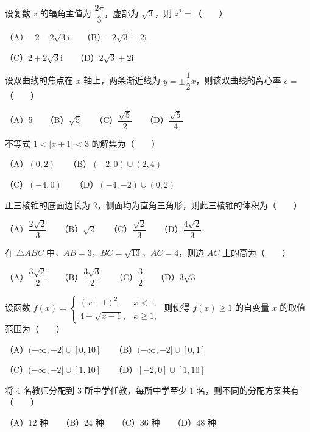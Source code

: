 \begin{question}
设复数 $z$ 的辐角主值为 $\dfrac{2\pi}{3}$，虚部为 $\sqrt{3}$，则 $z^2=$\mbox{（　　）}

（A）$-2-2\sqrt{3}\mathrm{i}$　　（B）$-2\sqrt{3}-2\mathrm{i}$

（C）$2+2\sqrt{3}\mathrm{i}$　　（D）$2\sqrt{3}+2\mathrm{i}$

\end{question}
\begin{question}
设双曲线的焦点在 $x$ 轴上，两条渐近线为 $y=\pm\dfrac{1}{2}x$，则该双曲线的离心率 $e=$\mbox{（　　）}

（A）5　　（B）$\sqrt{5}$　　（C）$\dfrac{\sqrt{5}}{2}$　　（D）$\dfrac{\sqrt{5}}{4}$

\end{question}
\begin{question}
不等式 $1<|x+1|<3$ 的解集为\mbox{（　　）}

（A）$(0,2)$　　（B）$(-2,0)\cup(2,4)$

（C）$(-4,0)$　　（D）$(-4,-2)\cup(0,2)$

\end{question}
\begin{question}
正三棱锥的底面边长为 2，侧面均为直角三角形，则此三棱锥的体积为\mbox{（　　）}

（A）$\dfrac{2\sqrt{2}}{3}$　　（B）$\sqrt{2}$　　（C）$\dfrac{\sqrt{2}}{3}$　　（D）$\dfrac{4\sqrt{2}}{3}$

\end{question}
\begin{question}
在 $\triangle ABC$ 中，$AB=3$，$BC=\sqrt{13}$，$AC=4$，则边 $AC$ 上的高为\mbox{（　　）}

（A）$\dfrac{3\sqrt{2}}{2}$　　（B）$\dfrac{3\sqrt{3}}{2}$　　（C）$\dfrac{3}{2}$　　（D）$3\sqrt{3}$

\end{question}
\begin{question}
设函数 $f(x)=\begin{cases}(x+1)^2,&x<1,\\ 4-\sqrt{x-1},&x\geqslant 1,\end{cases}$ 则使得 $f(x)\geqslant 1$ 的自变量 $x$ 的取值范围为\mbox{（　　）}

（A）$(-\infty,-2]\cup[0,10]$　　（B）$(-\infty,-2]\cup[0,1]$

（C）$(-\infty,-2]\cup[1,10]$　　（D）$[-2,0]\cup[1,10]$

\end{question}
\begin{question}
将 4 名教师分配到 3 所中学任教，每所中学至少 1 名，则不同的分配方案共有\mbox{（　　）}

（A）12 种　　（B）24 种　　（C）36 种　　（D）48 种

\end{question}

